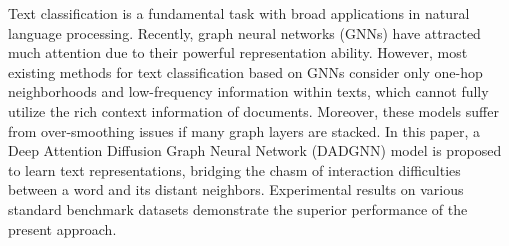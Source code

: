 Text classification is a fundamental task with broad applications in natural language processing. Recently, graph neural networks (GNNs) have attracted much attention due to their powerful representation ability. However, most existing methods for text classification based on GNNs consider only one-hop neighborhoods and low-frequency information within texts, which cannot fully utilize the rich context information of documents. Moreover, these models suffer from over-smoothing issues if many graph layers are stacked. In this paper, a Deep Attention Diffusion Graph Neural Network (DADGNN) model is proposed to learn text representations, bridging the chasm of interaction difficulties between a word and its distant neighbors. Experimental results on various standard benchmark datasets demonstrate the superior performance of the present approach.
